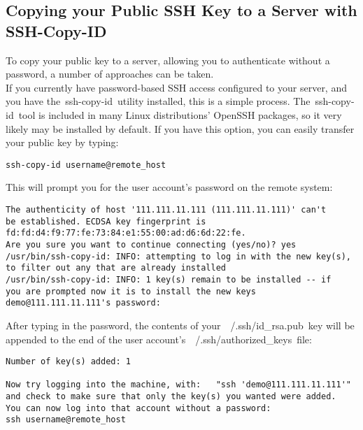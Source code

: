 \documentclass[12pt]{report}
\begin{document}
\subsection{Copying your Public SSH Key to a Server with SSH-Copy-ID}
To copy your public key to a server, allowing you to authenticate without a password, a number of approaches can be taken.
\\If you currently have password-based SSH access configured to your server, and you have the ssh-copy-id utility installed, this is a simple process. The ssh-copy-id tool is included in many Linux distributions' OpenSSH packages, so it very likely may be installed by default.
If you have this option, you can easily transfer your public key by typing:
\begin{lstlisting} 
ssh-copy-id username@remote_host
\end{lstlisting} 
This will prompt you for the user account's password on the remote system:
\begin{lstlisting} 
The authenticity of host '111.111.11.111 (111.111.11.111)' can't 
be established. ECDSA key fingerprint is 
fd:fd:d4:f9:77:fe:73:84:e1:55:00:ad:d6:6d:22:fe.
Are you sure you want to continue connecting (yes/no)? yes
/usr/bin/ssh-copy-id: INFO: attempting to log in with the new key(s), 
to filter out any that are already installed
/usr/bin/ssh-copy-id: INFO: 1 key(s) remain to be installed -- if 
you are prompted now it is to install the new keys
demo@111.111.11.111's password:
\end{lstlisting} 
After typing in the password, the contents of your ~/.ssh/id\_rsa.pub key will be appended to the end of the user account's ~/.ssh/authorized\_keys file:
\begin{lstlisting} 
Number of key(s) added: 1

Now try logging into the machine, with:   "ssh 'demo@111.111.11.111'"
and check to make sure that only the key(s) you wanted were added.
You can now log into that account without a password:
ssh username@remote_host
\end{lstlisting} 
\end{document}
